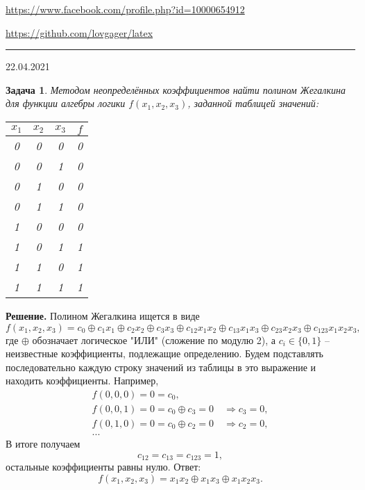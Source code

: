 \documentclass[12pt]{article}
\begin{document}


\begin{flushleft}
\url{https://www.facebook.com/profile.php?id=10000654912}

\url{https://github.com/lovgager/latex}
\end{flushleft}
\hrule 
\begin{flushright}
22.04.2021
\end{flushright}
\bigskip


\newtheorem*{task}{Задача}
\begin{task}
Методом неопределённых коэффициентов найти полином Жегалкина для функции алгебры логики $f(x_1, x_2, x_3)$, заданной таблицей значений:
\begin{table}[h]
    \centering
    \begin{tabular}{|c|c|c|c|}\hline
         $x_1$ & $x_2$ & $x_3$ & $f$ \\ \hline
         0 & 0 & 0 & 0 \\
         0 & 0 & 1 & 0 \\
         0 & 1 & 0 & 0 \\
         0 & 1 & 1 & 0 \\
         1 & 0 & 0 & 0 \\
         1 & 0 & 1 & 1 \\
         1 & 1 & 0 & 1 \\
         1 & 1 & 1 & 1 \\\hline
    \end{tabular}
\end{table}
\end{task}

\noindent\textbf{Решение.} 
Полином Жегалкина ищется в виде
\begin{equation*}
    f(x_1,x_2,x_3) = c_0 \oplus c_1x_1 \oplus c_2x_2 \oplus c_3x_3 \oplus c_{12}x_1x_2 \oplus c_{13}x_1x_3 \oplus c_{23}x_2x_3 \oplus c_{123}x_1x_2x_3,
\end{equation*}
где $\oplus$ обозначает логическое "ИЛИ" (сложение по модулю 2), а $c_i \in \{0, 1\}$ -- неизвестные коэффициенты, подлежащие определению. Будем подставлять последовательно каждую строку значений из таблицы в это выражение и находить коэффициенты. Например,
\begin{gather*}
    f(0,0,0) = 0 = c_0,\\
    f(0,0,1) = 0 = c_0 \oplus c_3=0\quad\Rightarrow c_3=0,\\
    f(0,1,0) = 0 = c_0 \oplus c_2=0\quad\Rightarrow c_2=0,\\ ...
\end{gather*}
В итоге получаем
\begin{equation*}
    c_{12} = c_{13} = c_{123} = 1,
\end{equation*}
остальные коэффициенты равны нулю. Ответ:
\begin{equation*}
    f(x_1, x_2, x_3) = x_1x_2 \oplus x_1x_3 \oplus x_1x_2x_3.
\end{equation*}
\end{document}
